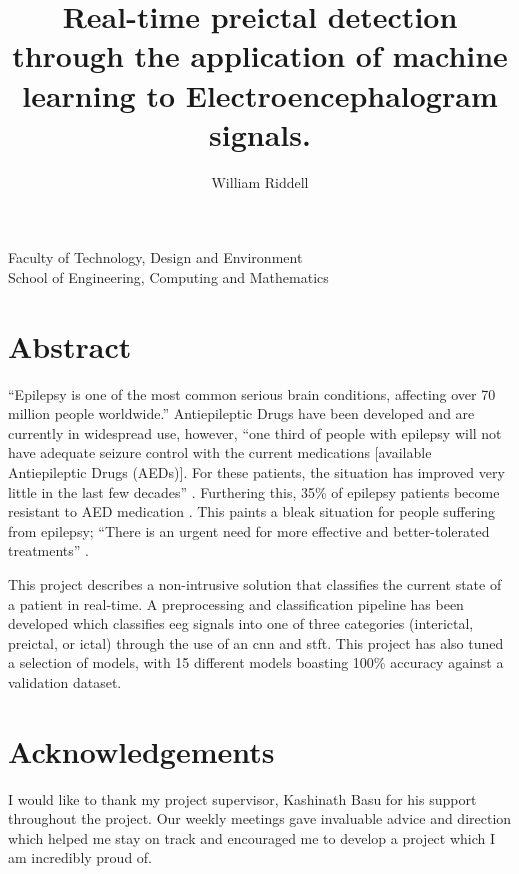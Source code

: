 \documentclass[12pt]{article}
\title{Real-time preictal detection through the application of machine learning to Electroencephalogram signals.}
\author{William Riddell}
\date{\parbox{\linewidth}{\centering
\vspace{0.5cm}
\today\endgraf\bigskip\vspace{0.5cm} 
Word Count: 9,133 \\ \vspace{0.5cm}  
Supervised by Kashinath Basu}}
\begin{document}


\maketitle

\vfill 
\begin{center} 
Faculty of Technology, Design and Environment\\
School of Engineering, Computing and Mathematics
\end{center}
\pagebreak
\tableofcontents
\listoffigures
\listoftables
\printglossary[type=\acronymtype]
\pagebreak


\section{Abstract}

“Epilepsy is one of the most common serious brain conditions, affecting over 70 million people worldwide.” \cite{thijs2019epilepsy} Antiepileptic Drugs have been developed and are currently in widespread use, however, “one third of people with epilepsy will not have adequate seizure control with the current medications [available Antiepileptic Drugs (AEDs)]. For these patients, the situation has improved very little in the last few decades” \cite{galanopoulou2012identification}. Furthering this, 35\% of epilepsy patients become resistant to AED medication \cite{moghim2014predicting}. This paints a bleak situation for people suffering from epilepsy; “There is an urgent need for more effective and better-tolerated treatments'' \cite{loscher2011modern}.

This project describes a non-intrusive solution that classifies the current state of a patient in real-time. A preprocessing and classification pipeline has been developed which classifies \acrfull{eeg} signals into one of three categories (interictal, preictal, or ictal) through the use of an \acrfull{cnn} and \acrfull{stft}. This project has also tuned a selection of models, with 15 different models boasting 100\% accuracy against a validation dataset.




\section{Acknowledgements}

I would like to thank my project supervisor, Kashinath Basu for his support throughout the project. Our weekly meetings gave invaluable advice and direction which helped me stay on track and encouraged me to develop a project which I am incredibly proud of. 
\end{document}
